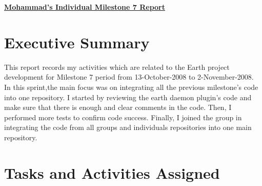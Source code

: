\begin{center}
{\large\textbf{\underline{{Mohammad's Individual Milestone 7 Report}}}}
\end{center}

\section*{Executive Summary}
This report records my activities which are related to the Earth project development for Milestone 7 period from 13-October-2008 to 2-November-2008.\\
In this sprint,the main focus was on integrating all the previous milestone's code into one repository. I started by reviewing the earth daemon plugin's code and make sure that there is enough and clear comments in the code. Then, I performed more tests to confirm code success. Finally, I joined the group in integrating the code from all groups and individuals repositories into one main repository.    

\section*{Tasks and Activities Assigned}

